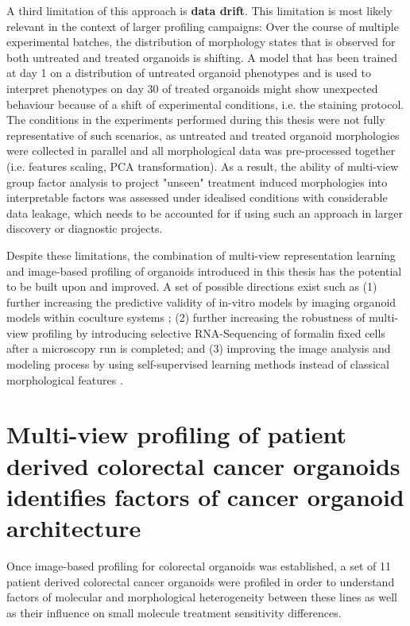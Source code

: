 \begin{flushleft}
A third limitation of this approach is \textbf{data drift}. This limitation is most likely relevant in the context of larger profiling campaigns: Over the course of multiple experimental batches, the distribution of morphology states that is observed for both untreated and treated organoids is shifting. A model that has been trained at day 1 on a distribution of untreated organoid phenotypes and is used to interpret phenotypes on day 30 of treated organoids might show unexpected behaviour because of a shift of experimental conditions, i.e. the staining protocol. The conditions in the experiments performed during this thesis were not fully representative of such scenarios, as untreated and treated organoid morphologies were collected in parallel and all morphological data was pre-processed together (i.e. features scaling, PCA transformation). As a result, the ability of multi-view group factor analysis to project "unseen" treatment induced morphologies into interpretable factors was assessed under idealised conditions with considerable data leakage, which needs to be accounted for if using such an approach in larger discovery or diagnostic projects.
\par
\bigbreak

Despite these limitations, the combination of multi-view representation learning and image-based profiling of organoids introduced in this thesis has the potential to be built upon and improved. A set of possible directions exist such as (1) further increasing the predictive validity of in-vitro models by imaging organoid models within coculture systems \parencite{cattaneoTumorOrganoidCell2020}; (2) further increasing the robustness of multi-view profiling by introducing selective RNA-Sequencing of formalin fixed cells after a microscopy run is completed; and (3) improving the image analysis and modeling process by using self-supervised learning methods instead of classical morphological features \parencite{perakisContrastiveLearningSingleCell2021}.

\section{Multi-view profiling of patient derived colorectal cancer organoids identifies factors of cancer organoid architecture}

Once image-based profiling for colorectal organoids was established, a set of 11 patient derived colorectal cancer organoids were profiled in order to understand factors of molecular and morphological heterogeneity between these lines as well as their influence on small molecule treatment sensitivity differences.


\end{flushleft}
